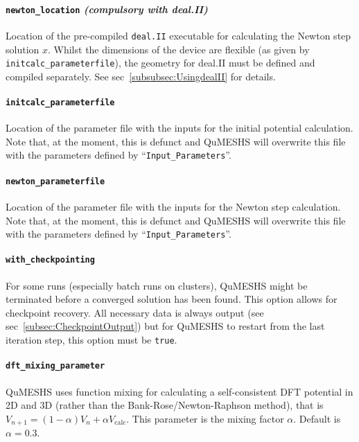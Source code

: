 \documentclass[12pt]{article}
\begin{document}
\paragraph{\texttt{newton\_location} \emph{(compulsory with deal.II)}}
Location of the pre-compiled \texttt{deal.II} executable for calculating the Newton
step solution $x$.  Whilst the dimensions of the device are flexible
(as given by \texttt{initcalc\_parameterfile}), the geometry for deal.II
must be defined and compiled separately.  See sec~\ref{subsubsec:UsingdealII}
for details.

\paragraph{\texttt{initcalc\_parameterfile}}
Location of the parameter file with the inputs for the initial potential
calculation.  Note that, at the moment, this is defunct and QuMESHS will
overwrite this file with the parameters defined by ``\texttt{Input\_Parameters}''.

\paragraph{\texttt{newton\_parameterfile}}
Location of the parameter file with the inputs for the Newton step
calculation.  Note that, at the moment, this is defunct and QuMESHS will
overwrite this file with the parameters defined by ``\texttt{Input\_Parameters}''.

\paragraph{\texttt{with\_checkpointing}}
For some runs (especially batch runs on clusters), QuMESHS might be terminated
before a converged solution has been found.  This option allows for checkpoint
recovery.  All necessary data is always output (see sec~\ref{subsec:CheckpointOutput})
but for QuMESHS to restart from the last iteration step, this option must be
\texttt{true}.

\paragraph{\texttt{dft\_mixing\_parameter}}
QuMESHS uses function mixing for calculating a self-consistent DFT potential
in 2D and 3D (rather than the Bank-Rose/Newton-Raphson method), that is
$V_{n+1} = (1 - \alpha) V_{n} + \alpha V_{\mathrm{calc}}$.  This parameter is
the mixing factor $\alpha$.  Default is $\alpha = 0.3$.
\end{document}
